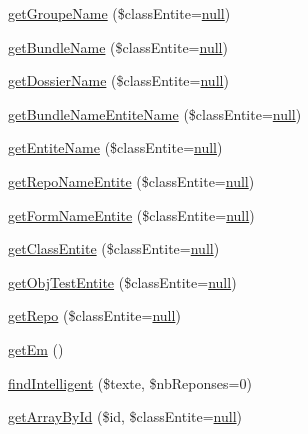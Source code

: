 \begin{DoxyCompactItemize}
\hyperlink{classentities_generic_ab19f8c2265322b83ffb38fdeb0cc8602}{get\+Groupe\+Name} (\$class\+Entite=\hyperlink{validate_8js_afb8e110345c45e74478894341ab6b28e}{null})
\item 
\hyperlink{classentities_generic_adcbfa678e919b9a29fdaba012746c655}{get\+Bundle\+Name} (\$class\+Entite=\hyperlink{validate_8js_afb8e110345c45e74478894341ab6b28e}{null})
\item 
\hyperlink{classentities_generic_a1c59fa97050cb79860d2e98306045a0e}{get\+Dossier\+Name} (\$class\+Entite=\hyperlink{validate_8js_afb8e110345c45e74478894341ab6b28e}{null})
\item 
\hyperlink{classentities_generic_aabe9cadcf3856e0a349b052189304946}{get\+Bundle\+Name\+Entite\+Name} (\$class\+Entite=\hyperlink{validate_8js_afb8e110345c45e74478894341ab6b28e}{null})
\item 
\hyperlink{classentities_generic_a76e38fb5b132dce77ef0bf544399bfd6}{get\+Entite\+Name} (\$class\+Entite=\hyperlink{validate_8js_afb8e110345c45e74478894341ab6b28e}{null})
\item 
\hyperlink{classentities_generic_a17eb638f307e93c19c3e38205d7682fc}{get\+Repo\+Name\+Entite} (\$class\+Entite=\hyperlink{validate_8js_afb8e110345c45e74478894341ab6b28e}{null})
\item 
\hyperlink{classentities_generic_af462e1a31a5168527ee1860591252034}{get\+Form\+Name\+Entite} (\$class\+Entite=\hyperlink{validate_8js_afb8e110345c45e74478894341ab6b28e}{null})
\item 
\hyperlink{classentities_generic_adff838b646f94e5c1864dfe3a2b8fb53}{get\+Class\+Entite} (\$class\+Entite=\hyperlink{validate_8js_afb8e110345c45e74478894341ab6b28e}{null})
\item 
\hyperlink{classentities_generic_a67771f4982edb5bed64c40e9f01df2b0}{get\+Obj\+Test\+Entite} (\$class\+Entite=\hyperlink{validate_8js_afb8e110345c45e74478894341ab6b28e}{null})
\item 
\hyperlink{classentities_generic_acebe254bed136bf8d0aa8627aea9d008}{get\+Repo} (\$class\+Entite=\hyperlink{validate_8js_afb8e110345c45e74478894341ab6b28e}{null})
\item 
\hyperlink{classentities_generic_adc11fbcc429285ba21d582df82964b8c}{get\+Em} ()
\item 
\hyperlink{classentities_generic_a7dafe50f1619cacfa0c7b92c7a3a2637}{find\+Intelligent} (\$texte, \$nb\+Reponses=0)
\item 
\hyperlink{classentities_generic_a25eba835de9952f5086361c08b780eb3}{get\+Array\+By\+Id} (\$id, \$class\+Entite=\hyperlink{validate_8js_afb8e110345c45e74478894341ab6b28e}{null})

\end{DoxyCompactItemize}
